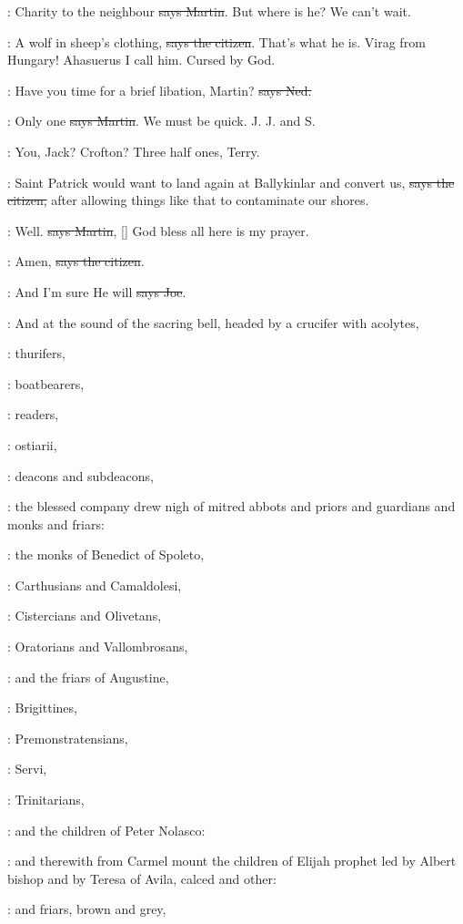 \cunningham:
Charity to the neighbour \sout{says Martin}.
But where is he? We can't wait.

\citizen:
A wolf in sheep's clothing,
\sout{says the citizen}. That's what he is. Virag
from Hungary! Ahasuerus I call him. Cursed by God.

\lambert:
Have you time for a brief libation,
Martin? \sout{says Ned.}

\cunningham:
Only one \sout{says Martin}.
We must be quick. J. J. and S.

\lambert:
You, Jack? Crofton? Three half ones, Terry.

\citizen:
Saint Patrick would want to land again
at Ballykinlar and convert us,
\sout{says the citizen,} after allowing things like that to contaminate our
shores.

\cunningham:
Well. \sout{says Martin},
[] God bless all here is my
prayer.

\citizen:
Amen, \sout{says the citizen}.

\joe:
And I'm sure He will \sout{says Joe}.

:
And at the sound of the sacring bell,
headed by a crucifer with acolytes,

:
thurifers,

:
boatbearers,

:
readers,

:
ostiarii,

:
deacons and subdeacons,

:
the blessed company drew nigh of mitred abbots
and priors and guardians and monks and friars:

:
the monks of Benedict of Spoleto,

:
Carthusians and Camaldolesi,

:
Cistercians and Olivetans,

:
Oratorians and Vallombrosans,

:
and the friars of Augustine,

:
Brigittines,

:
Premonstratensians,

:
Servi,

:
Trinitarians,

:
and the children of Peter Nolasco:

:
and therewith from Carmel mount the children of
Elijah prophet led by Albert bishop and by Teresa of Avila,
calced and other:

:
and friars, brown and grey,

